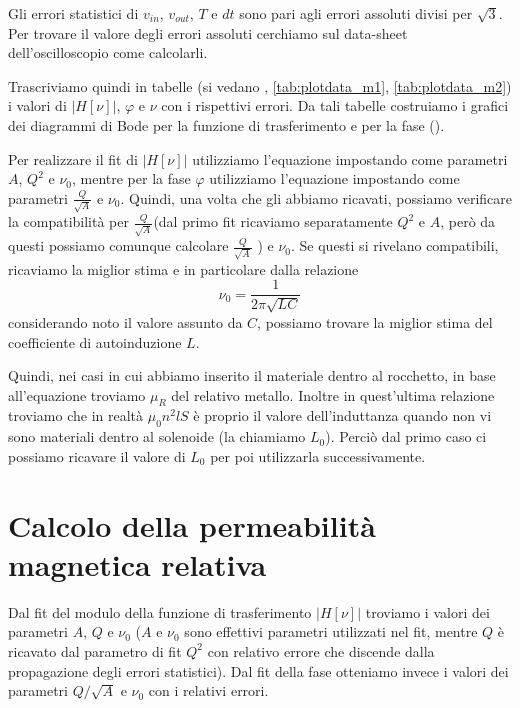 \documentclass[
    prl,
    floatfix,
    reprint, 
    superscriptaddress, 
    altaffilletter, 
    amsmath, 
    amssymb, 
    a4paper]{revtex4-2}
\begin{document}
Gli errori statistici di $v_{in}$, $v_{out}$, $T$ e $dt$ sono pari agli errori assoluti divisi per $\sqrt{3}$. Per trovare il valore degli errori assoluti cerchiamo sul data-sheet dell'oscilloscopio come calcolarli.

Trascriviamo quindi in tabelle (si vedano , \ref{tab:plotdata_m1}, \ref{tab:plotdata_m2}) i valori di $\big|H[\nu]\big|$, $\varphi$ e $\nu$ con i rispettivi errori. Da tali tabelle costruiamo i grafici dei diagrammi di Bode per la funzione di trasferimento e per la fase (). 



Per realizzare il fit di $\big|H[\nu]\big|$ utilizziamo l'equazione  impostando come parametri $A$, $Q^2$ e $\nu_{0}$, mentre per la fase $\varphi$ utilizziamo l'equazione  impostando come parametri $\frac{Q}{\sqrt{A}}$ e $\nu_0$. Quindi, una volta che gli abbiamo ricavati, possiamo verificare la compatibilità per $\frac{Q}{\sqrt{A}}$(dal primo fit ricaviamo separatamente $Q^2$ e $A$, però da questi possiamo comunque calcolare $\frac{Q}{\sqrt{A}}$ ) e $\nu_0$. Se questi si rivelano compatibili, ricaviamo la miglior stima e in particolare dalla relazione \[\nu_0=\frac{1}{2\pi\sqrt{LC}}\]  considerando noto il valore assunto da $C$, possiamo trovare la miglior stima del coefficiente di autoinduzione $L$. 

Quindi, nei casi in cui abbiamo inserito il materiale dentro al rocchetto, in base all'equazione  troviamo $\mu_R$ del relativo metallo. Inoltre in quest'ultima relazione troviamo che in realtà $\mu_0 n^2 l S$ è proprio il valore dell'induttanza quando non vi sono materiali dentro al solenoide (la chiamiamo $L_0$). Perciò dal primo caso ci possiamo ricavare il valore di $L_0$ per poi utilizzarla successivamente. 

\section*{Calcolo della permeabilità magnetica relativa}

Dal fit del modulo della funzione di trasferimento $\big|H[\nu]\big|$ troviamo i valori dei parametri $A$, $Q$ e $\nu_0$ ($A$ e $\nu_0$ sono effettivi parametri utilizzati nel fit, mentre $Q$ è ricavato dal parametro di fit $Q^2$ con relativo errore che discende dalla propagazione degli errori statistici). Dal fit della fase otteniamo invece i valori dei parametri $Q / \sqrt{A}$ e $\nu_0$ con i relativi errori. 
\end{document}

